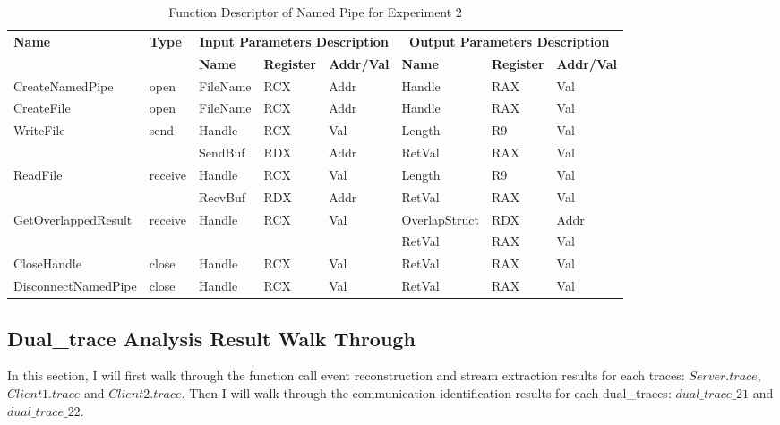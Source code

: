 \begin{table}[H]
  \centering
  \caption{Function Descriptor of Named Pipe for Experiment 2}
  \label{fdescexp2}
\begin{tabular}{|l|l|l|l|l|l|l|l|}
\hline
             \multirow{2}{*}{{\textbf{Name}}} & \multirow{2}{*}{{\textbf{Type}}} & \multicolumn{3}{c|}{\textbf{Input Parameters Description}} & \multicolumn{3}{c|}{\textbf{Output Parameters Description}} \\
              \cline{3-8} 
             & & \textbf{Name}& \textbf{Register} & \textbf{Addr/Val} & \textbf{Name}& \textbf{Register} &  \textbf{Addr/Val}  \\
             \hline
      CreateNamedPipe
       &open & FileName & RCX  & Addr &  Handle & RAX & Val\\
      \hline         
      CreateFile
       &open & FileName & RCX & Addr&  Handle & RAX & Val\\ 
      \hline              
      \multirow{2}{*}{WriteFile}
       &\multirow{2}{*}{send} &  Handle & RCX & Val & Length & R9 & Val\\
        \cline{3-8} 
       & & SendBuf & RDX & Addr & RetVal& RAX & Val\\
      \hline            
      \multirow{2}{*}{ReadFile}
       &\multirow{2}{*}{receive} &  Handle & RCX & Val& Length & R9 & Val\\
        \cline{3-8} 
       & & RecvBuf & RDX  & Addr & RetVal& RAX & Val\\
      \hline    
           \multirow{2}{*}{GetOverlappedResult} &
       \multirow{2}{*}{receive} &  \multirow{2}{*}{Handle} & \multirow{2}{*}{RCX} & \multirow{2}{*}{Val} &OverlapStruct &RDX & Addr\\
               \cline{6-8} 
       & &  &   &  & RetVal& RAX & Val\\
      \hline     
      CloseHandle &
       close &  Handle & RCX & Val & RetVal& RAX & Val\\
      \hline            
      DisconnectNamedPipe &
      close &  Handle & RCX & Val & RetVal& RAX & Val\\
      \hline               
  \end{tabular}  
\end{table} 

\subsection{Dual\_trace Analysis Result Walk Through}
In this section, I will first walk through the function call event reconstruction and stream extraction results for each traces: $Server.trace$, $Client1.trace$ and $Client2.trace$. Then I will walk through the communication identification results for each dual\_traces: $dual\_trace\_21$ and $dual\_trace\_22$.

